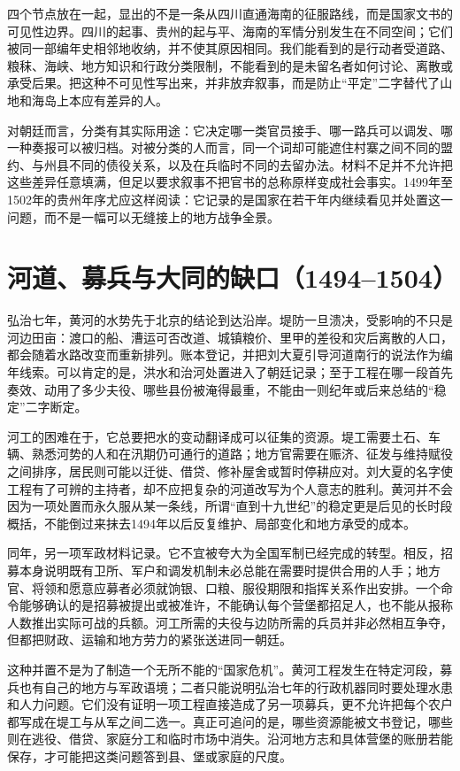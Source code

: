 四个节点放在一起，显出的不是一条从四川直通海南的征服路线，而是国家文书的可见性边界。四川的起事、贵州的起与平、海南的军情分别发生在不同空间；它们被同一部编年史相邻地收纳，并不使其原因相同。我们能看到的是行动者受道路、粮秣、海峡、地方知识和行政分类限制，不能看到的是未留名者如何讨论、离散或承受后果。把这种不可见性写出来，并非放弃叙事，而是防止“平定”二字替代了山地和海岛上本应有差异的人。

对朝廷而言，分类有其实际用途：它决定哪一类官员接手、哪一路兵可以调发、哪一种奏报可以被归档。对被分类的人而言，同一个词却可能遮住村寨之间不同的盟约、与州县不同的债役关系，以及在兵临时不同的去留办法。材料不足并不允许把这些差异任意填满，但足以要求叙事不把官书的总称原样变成社会事实。1499年至1502年的贵州年序尤应这样阅读：它记录的是国家在若干年内继续看见并处置这一问题，而不是一幅可以无缝接上的地方战争全景。

\section{河道、募兵与大同的缺口（1494--1504）}

弘治七年，黄河的水势先于北京的结论到达沿岸。堤防一旦溃决，受影响的不只是河边田亩：渡口的船、漕运可否改道、城镇粮价、里甲的差役和灾后离散的人口，都会随着水路改变而重新排列。账本登记，并把刘大夏引导河道南行的说法作为编年线索。可以肯定的是，洪水和治河处置进入了朝廷记录；至于工程在哪一段首先奏效、动用了多少夫役、哪些县份被淹得最重，不能由一则纪年或后来总结的“稳定”二字断定。

河工的困难在于，它总要把水的变动翻译成可以征集的资源。堤工需要土石、车辆、熟悉河势的人和在汛期仍可通行的道路；地方官需要在赈济、征发与维持赋役之间排序，居民则可能以迁徙、借贷、修补屋舍或暂时停耕应对。刘大夏的名字使工程有了可辨的主持者，却不应把复杂的河道改写为个人意志的胜利。黄河并不会因为一项处置而永久服从某一条线，所谓“直到十九世纪”的稳定更是后见的长时段概括，不能倒过来抹去1494年以后反复维护、局部变化和地方承受的成本。

同年，另一项军政材料记录。它不宜被夸大为全国军制已经完成的转型。相反，招募本身说明既有卫所、军户和调发机制未必总能在需要时提供合用的人手；地方官、将领和愿意应募者必须就饷银、口粮、服役期限和指挥关系作出安排。一个命令能够确认的是招募被提出或被准许，不能确认每个营堡都招足人，也不能从报称人数推出实际可战的兵额。河工所需的夫役与边防所需的兵员并非必然相互争夺，但都把财政、运输和地方劳力的紧张送进同一朝廷。

这种并置不是为了制造一个无所不能的“国家危机”。黄河工程发生在特定河段，募兵也有自己的地方与军政语境；二者只能说明弘治七年的行政机器同时要处理水患和人力问题。它们没有证明一项工程直接造成了另一项募兵，更不允许把每个农户都写成在堤工与从军之间二选一。真正可追问的是，哪些资源能被文书登记，哪些则在逃役、借贷、家庭分工和临时市场中消失。沿河地方志和具体营堡的账册若能保存，才可能把这类问题答到县、堡或家庭的尺度。

